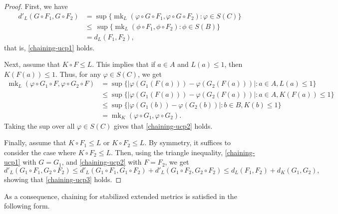 \documentclass[11pt, a4paper, oneside, final, reqno]{amsart}
\newcommand{\mk}{\operatorname{mk}}
\theoremstyle{definition}
\theoremstyle{plain}
\theoremstyle{remark}
\numberwithin{equation}{section}
\begin{document}
\begin{proof}
    First, we have
    \begin{align*}
        d'_{L}(G \circ F_1, G \circ F_2)& = \sup\{ \mk_L(\varphi \circ G \circ F_1, \varphi \circ G \circ F_2) : \varphi \in S(C)\}\\
        & \leq \,\sup\{ \mk_L(\phi \circ F_1, \phi \circ F_2) : \phi \in S(B)\}\\
        & = d_L(F_1,F_2),
    \end{align*}
    that is, \eqref{chaining-ucp1} holds.

    Next, assume that $K\circ F \leq L$. This implies that if $a\in A$ and $L(a)\leq 1$, then $K(F(a)) \leq 1$. Thus, for any $\varphi \in S(C)$, we get
    \begin{align*}
        \mk_L(\varphi\circ G_1 \circ F, \varphi\circ G_2 \circ F)& = \sup\{ \big|\varphi(G_1(F(a))) - \varphi(G_2(F(a)))\big| : a \in A, L(a)\leq 1\}\\
        & \leq \sup\{ \big|\varphi(G_1(F(a))) - \varphi(G_2(F(a)))\big| : a \in A, K(F(a))\leq 1\}\\
        & \leq \sup\{ \big|\varphi(G_1(b)) - \varphi(G_2(b))\big| : b \in B, K(b)\leq 1\}\\
        & = \mk_K(\varphi\circ G_1, \varphi\circ G_2).
    \end{align*}
    Taking the sup over all  $\varphi \in S(C)$ gives that \eqref{chaining-ucp2} holds.

    Finally, assume that $K\circ F_1 \leq L$ or $K\circ F_2 \leq L$. By symmetry, it suffices to consider the case where $K\circ F_2 \leq L$. Then, using the triangle inequality, \eqref{chaining-ucp1} with $G=G_1$, and \eqref{chaining-ucp2} with $F=F_2$,  we get
    \begin{equation*}
        d'_{L}(G_1 \circ F_1, G_2 \circ F_2) \leq d'_{L}(G_1 \circ F_1, G_1 \circ F_2) + d'_{L}(G_1 \circ F_2, G_2 \circ F_2) \leq d_L(F_1,F_2) + d_K(G_1,G_2),
    \end{equation*}
    showing that \eqref{chaining-ucp3} holds.
\end{proof}

As a consequence, chaining for stabilized extended metrics is satisfied in the following form.
\end{document}
